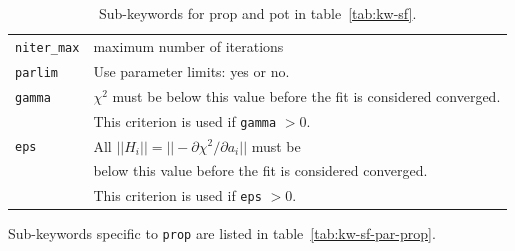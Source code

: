 \documentclass[a4paper,12pt,onecolumn]{article}
\begin{document}
\begin{table}[!h]
\caption{
Sub-keywords for \textrm{prop} and \textrm{pot} in table~\ref{tab:kw-sf}.
\label{tab:kw-sf-par}
}
\begin{center}
\begin{tabular}{|l|l|}
\hline
\hline
\verb+niter_max+  & maximum number of iterations \\
\verb+parlim+      & Use parameter limits: yes or no. \\
\verb+gamma+       & $\chi^2$ must be below this value before the fit is considered converged. \\
                   & This criterion is used if \verb+gamma+ $> 0$. \\
\verb+eps+          & All $||H_i|| = ||-\partial \chi^2 / \partial a_i||$ must be \\
                     & below this value before the fit is considered converged. \\
                   & This criterion is used if \verb+eps+ $> 0$. \\
\hline
\hline
\end{tabular}
\end{center}
\end{table}




Sub-keywords specific to \verb+prop+ are listed in table~\ref{tab:kw-sf-par-prop}.
\end{document}

